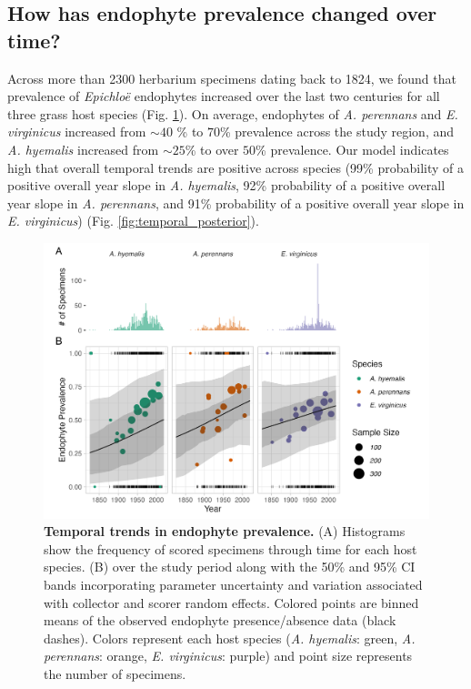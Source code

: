 \documentclass[11pt]{article}
\newcommand{\revise}[1]{{\color{black}{#1}}}
\begin{document}
\subsection*{How has endophyte prevalence changed over time?}
Across more than 2300 herbarium specimens dating back to 1824, we found that prevalence of \emph{Epichloë} endophytes increased over the last two centuries for all three grass host species (Fig. \ref{fig:temporal}). 
On average, endophytes of \emph{A. perennans} and \emph{E. virginicus} increased from $\sim 40$ \% to  $70$\% prevalence across the study region, and \emph{A. hyemalis} increased from $\sim 25$\% to over $50$\% prevalence.
Our model indicates high \revise{confidence} that overall temporal trends are positive across species (99\% probability of a positive overall year slope in \emph{A. hyemalis}, 92\% probability of a positive overall year slope in \emph{A. perennans}, and 91\% probability of a positive overall year slope in \emph{E. virginicus}) (Fig. \ref{fig:temporal_posterior}). 

\begin{figure}[H]
	\centering
	\includegraphics[width = \linewidth]{../Plots/year_plot.png}
	\caption[Temporal trends in endophyte prevalence.]{\textbf{Temporal trends in endophyte prevalence.} (A) Histograms show the frequency of scored specimens through time for each host species. (B)\revise{ Lines show mean endophyte prevalence predicted by the endophyte prevalence model} over the study period along with the 50\%  and 95\% CI bands incorporating parameter uncertainty and variation associated with collector and scorer random effects. Colored points are binned means of the observed endophyte presence/absence data (black dashes). Colors represent each host species (\emph{A. hyemalis}: green, \emph{A. perennans}: orange, \emph{E. virginicus}: purple) and point size represents the number of specimens.}
	\label{fig:temporal}
\end{figure}
\end{document}
